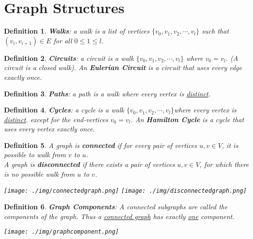 \documentclass[11pt, a4paper, oneside]{book}
\theoremstyle{theoremdd}
\newtheorem*{definition}{Definition}
\theoremstyle{remark}
\begin{document}
\section*{Graph Structures}
\begin{definition}
\textbf{Walks}: a walk is a list of vertices $\{v_{0},v_{1},v_{2},\cdots,v_{l}\}$ such that $(v_{i},v_{i+1}) \in E$ for all $0\leq 1 \leq l$.
\end{definition}

\begin{definition}
\textbf{Circuits}: a circuit is a walk $\{v_{0},v_{1},v_{2},\cdots,v_{l}\}$ where $v_{0}=v_{l}$. (A circuit is a closed walk). An \textbf{Eulerian Circuit} is a circuit that uses every edge exactly once. 
\end{definition}

\begin{definition}
\textbf{Paths}: a path is a walk where every vertex is \underline{distinct}.
\end{definition}

\begin{definition}
\textbf{Cycles}: a cycle is a walk $\{v_{0},v_{1},v_{2},\cdots,v_{l}\}$where every vertex is \underline{distinct}. except for the end-vertices $v_{0}=v_{l}$. An \textbf{Hamilton Cycle} is a cycle that uses every vertex exactly once. 
\end{definition}

\begin{definition}
A graph is \textbf{connected} if for every pair of vertices $u,v\in V$, it is possible to walk from $v$ to $u$.  \\
A graph is \textbf{disconnected} if there exists a pair of vertices $u,v\in V$, for which there is no possible walk from $u$ to $v$. 
\begin{center}
\texttt{[image: ./img/connectedgraph.png]}
\texttt{[image: ./img/disconnectedgraph.png]}
\end{center}
\end{definition}

\begin{definition}
\textbf{Graph Components}: A connected subgraphs are called the components of the graph. Thus a \underline{connected graph} has exactly \underline{one} component.
\begin{center}
\texttt{[image: ./img/graphcomponent.png]}
\end{center} 
\end{definition}
\end{document}
